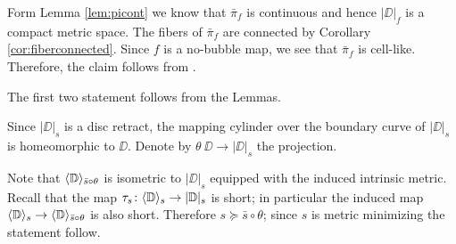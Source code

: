 Form Lemma \ref{lem:picont} we know that $\bar\pi_f$ is continuous and hence $|\DD|_f$
is a compact metric space. 
The fibers of $\bar\pi_f$ are connected by Corollary \ref{cor:fiberconnected}.
Since $f$ is a no-bubble map, we see that $\bar\pi_f$ is cell-like. 
Therefore, the claim follows from \cite[Corollary 7.12]{LW3}.
\qeds

The first two statement follows from the Lemmas.

Since $|\DD|_s$ is a disc retract, the mapping cylinder over the boundary curve of $|\DD|_s$ is homeomorphic to $\DD$.
Denote by $\theta\:\DD\to |\DD|_s$ the projection.

Note that $\langle\mathbb{D}\rangle_{\bar s\circ\theta}$ is isometric to $|\DD|_s$ equipped with the induced intrinsic metric.
Recall that the map $\tau_s\colon\langle\mathbb{D}\rangle_s\to|\mathbb{D}|_s$ is short;
in particular the induced map $\langle\mathbb{D}\rangle_s\to\langle\mathbb{D}\rangle_{\bar s\circ\theta}$ is also short.
Therefore $s\succcurlyeq \bar s\circ\theta$;
since $s$ is metric minimizing the statement follow.
\qeds
